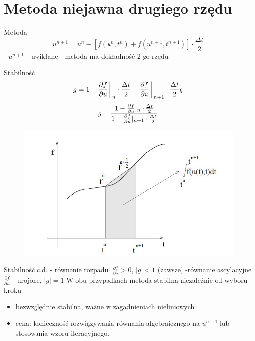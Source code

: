 \section{Metoda niejawna drugiego rzędu}
\begin{frame}{Metoda}
	$$u^{n+1} = u^n - [f(u^n,t^n)+f(u^{n+1},t^{n+1})]\cdot \frac{\Delta t}{2}$$
    \newline
    - $u^{n+1}$ - uwikłane
    \newline
    - metoda ma dokładność 2-go rzędu
\end{frame}
\begin{frame}{Stabilność}
	$$g = 1-\frac{\partial f}{\partial u}\bigg\arrowvert_n \cdot\frac{\Delta t}{2}-\frac{\partial f}{\partial u}\bigg\arrowvert_{n+1}\cdot \frac{\Delta t}{2} g$$
	$$g=\frac{1-\frac{\partial f}{\partial u}\arrowvert_n \cdot \frac{\Delta t}{2}}{1+\frac{\partial f}{\partial u}\arrowvert_{n+1} \cdot \frac{\Delta t}{2}}$$
    \begin{figure}
    	\includegraphics[height=0.55\textheight]{img/stabilnosc.jpg}
    \end{figure}
\end{frame}
\begin{frame}{Stabilność c.d.}
	- równanie rozpadu: $\frac{\partial f}{\partial u} > 0$, \quad $|g| < 1$ (zawsze)
    \newline
    -równanie oscylacyjne $\frac{\partial f}{\partial u}$ - urojone, $|g| = 1$
    \newline\newline
    W obu przypadkach metoda stabilna niezależnie od wyboru kroku
    \begin{itemize}
      \item bezwzględnie stabilna, ważne w zagadnieniach nieliniowych
      \item cena: konieczność rozwiązywania równania algebraicznego na $u^{n+1}$ lub stosowania wzoru iteracyjnego.
    \end{itemize}
\end{frame}
